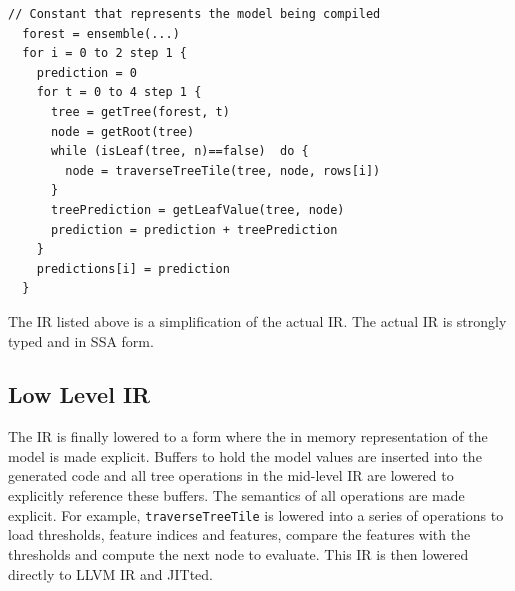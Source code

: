 \begin{lstlisting}[style=c++]
  // Constant that represents the model being compiled
  forest = ensemble(...)
  for i = 0 to 2 step 1 {
    prediction = 0
    for t = 0 to 4 step 1 {
      tree = getTree(forest, t) 
      node = getRoot(tree)
      while (isLeaf(tree, n)==false)  do {
        node = traverseTreeTile(tree, node, rows[i])
      }
      treePrediction = getLeafValue(tree, node)
      prediction = prediction + treePrediction
    }
    predictions[i] = prediction
  }
\end{lstlisting}

The IR listed above is a simplification of the actual IR. The actual IR is strongly typed and in SSA form.

\subsection{Low Level IR}
The IR is finally lowered to a form where the in memory representation of the model is made explicit. Buffers to hold the model values are inserted into the generated code and all tree operations in the mid-level IR are lowered to explicitly reference these buffers. The semantics of all operations are made explicit. For example, \texttt{traverseTreeTile} is lowered into a series of operations to load thresholds, feature indices and features, compare the features with the thresholds and compute the next node to evaluate. This IR is then lowered directly to LLVM IR and JITted.


